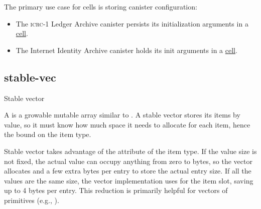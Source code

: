 \documentclass{article}
\begin{document}
The primary use case for cells is storing canister configuration:
\begin{itemize}
  \item The \textsc{icrc-1} Ledger Archive canister persists its initialization arguments in a \href{https://github.com/dfinity/ic/blob/9cdb1e62bcd199f28ae0005ed3f762487a1454df/rs/rosetta-api/icrc1/archive/src/main.rs#L49}{cell}.
  \item The Internet Identity Archive canister holds its init arguments in a \href{https://github.com/dfinity/internet-identity/blob/b66fe925fb0a337b09aaaa5beaf1a60994b19f14/src/archive/src/main.rs#L85}{cell}.
\end{itemize}

\subsection{stable-vec}{Stable vector}

A  is a growable mutable array similar to \href{https://doc.rust-lang.org/std/vec/struct.Vec.html}{}.
A stable vector stores its items by value, so it must know how much space it needs to allocate for each item, hence the \href{#bounded-storable-trait}{} bound on the item type.

Stable vector takes advantage of the \href{#is-fixed-size-attribute}{} attribute of the item type.
If the value size is not fixed, the actual value can occupy anything from zero to \href{#max-size-attribute}{} bytes, so the vector allocates \href{#max-size-attribute}{} and a few extra bytes per entry to store the actual entry size.
If all the values are the same size, the vector implementation uses \href{#max-size-attribute}{} for the item slot, saving up to 4 bytes per entry.
This reduction is primarily helpful for vectors of primitives (e.g., ).
\end{document}
